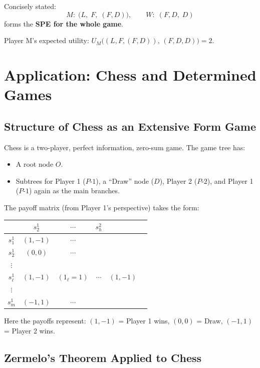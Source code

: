\documentclass[12pt, a4paper]{article}
\begin{document}
\noindent Concisely stated:
\[
  M:\; \bigl(L,\; F,\; (F,D)\bigr), \qquad W:\; (F,D,\; D)
\]
forms the \textbf{SPE for the whole game}.

\begin{notebox}
  Player M's expected utility: $U_M\bigl((L,F,(F,D)),\,(F,D,D)\bigr) = 2$.
\end{notebox}

\section{Application: Chess and Determined Games}

\subsection{Structure of Chess as an Extensive Form Game}

Chess is a two-player, perfect information, zero-sum game. The game tree has:
\begin{itemize}
  \item A root node $O$.
  \item Subtrees for Player 1 ($P\text{-}1$), a ``Draw'' node ($D$), Player 2 ($P\text{-}2$), and Player 1 ($P\text{-}1$) again as the main branches.
\end{itemize}

The payoff matrix (from Player 1's perspective) takes the form:

\medskip
\begin{center}
\begin{tabular}{c|ccccc}
   & $s_2^1$ & $\cdots$ & $s_h^2$ \\\hline
  $s_1^1$ & $(1,-1)$ & $\cdots$ & \\
  $s_2^1$ & $(0,0)$ & $\cdots$ & \\
  $\vdots$ & & & \\
  $s_\ell^1$ & $(1,-1)$ & $(1_{\ell}=1)$ & $\cdots$ & $(1,-1)$ \\
  $\vdots$ & & & \\
  $s_m^1$ & $(-1,1)$ & $\cdots$ & \\
\end{tabular}
\end{center}

\noindent Here the payoffs represent: $(1,-1)$ = Player 1 wins, $(0,0)$ = Draw, $(-1,1)$ = Player 2 wins.

\subsection{Zermelo's Theorem Applied to Chess}
\end{document}
